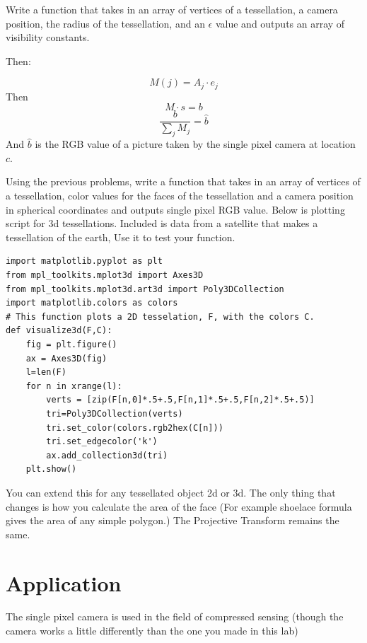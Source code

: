 \begin{problem}
Write a function that takes in an array of vertices of a tessellation, a camera position, the radius of the tessellation, and an $\epsilon$ value and outputs an array of visibility constants.
\end{problem}
Then:

\begin{equation}
M(j) = A_j \cdot e_j
\end{equation}
Then
\begin{equation}
M \cdot s = b
\end{equation}
\begin{equation}
\frac{b}{\sum_j M_j} = \hat{b}
\end{equation}
And $\hat{b}$ is the RGB value of a picture taken by the single pixel camera at location $c$.

\begin{problem}
Using the previous problems, write a function that takes in an array of vertices of a tessellation, color values for the faces of the tessellation and a camera position in spherical coordinates and outputs single pixel RGB value. Below is plotting script for 3d tessellations. Included is data from a satellite that makes a tessellation of the earth, Use it to test your function.
\end{problem}

\begin{lstlisting}
import matplotlib.pyplot as plt
from mpl_toolkits.mplot3d import Axes3D
from mpl_toolkits.mplot3d.art3d import Poly3DCollection
import matplotlib.colors as colors
# This function plots a 2D tesselation, F, with the colors C. 
def visualize3d(F,C):
    fig = plt.figure()
    ax = Axes3D(fig)
    l=len(F)
    for n in xrange(l):
        verts = [zip(F[n,0]*.5+.5,F[n,1]*.5+.5,F[n,2]*.5+.5)]
        tri=Poly3DCollection(verts)
        tri.set_color(colors.rgb2hex(C[n]))
        tri.set_edgecolor('k')
        ax.add_collection3d(tri)
    plt.show()
\end{lstlisting}


You can extend this for any tessellated object 2d or 3d. The only thing that changes is how you calculate the area of the face (For example shoelace formula gives the area of any simple polygon.) The Projective Transform remains the same. 

\section*{Application}
The single pixel camera is used in the field of compressed sensing (though the camera works a little differently than the one you made in this lab)
